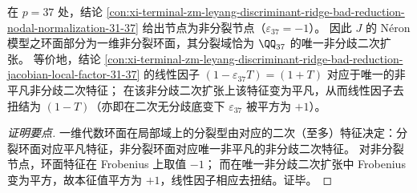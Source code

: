\begin{conclusion}[\texorpdfstring{$p=37$}{p=37} 处非分裂节点的最小分裂域：唯一非分歧二次扩张与线性因子去扭结]\label{con:xi-terminal-zm-leyang-discriminant-ridge-bad-reduction-37-minimal-splitting-field}
在 \(p=37\) 处，结论 \ref{con:xi-terminal-zm-leyang-discriminant-ridge-bad-reduction-nodal-normalization-31-37} 给出节点为非分裂节点（\(\varepsilon_{37}=-1\)）。
因此 \(J\) 的 N\'eron 模型之环面部分为一维非分裂环面，其分裂域恰为 \(\QQ_{37}\) 的唯一非分歧二次扩张。
等价地，结论 \ref{con:xi-terminal-zm-leyang-discriminant-ridge-bad-reduction-jacobian-local-factor-31-37} 的线性因子 \((1-\varepsilon_{37}T)=(1+T)\) 对应于唯一的非平凡非分歧二次特征；
在该非分歧二次扩张上该特征变为平凡，从而线性因子去扭结为 \((1-T)\)（亦即在二次无分歧底变下 \(\varepsilon_{37}\) 被平方为 \(+1\)）。
\end{conclusion}
\begin{proof}[证明要点]
一维代数环面在局部域上的分裂型由对应的二次（至多）特征决定：分裂环面对应平凡特征，非分裂环面对应唯一非平凡的非分歧二次特征。
对非分裂节点，环面特征在 Frobenius 上取值 \(-1\)；
而在唯一非分歧二次扩张中 Frobenius 变为平方，故本征值平方为 \(+1\)，线性因子相应去扭结。证毕。
\end{proof}

